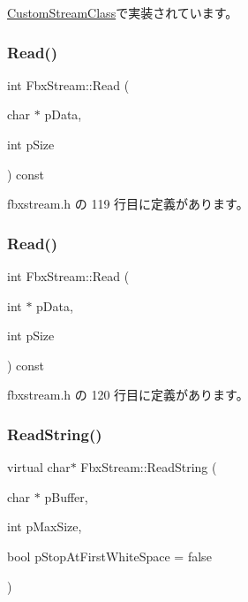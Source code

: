\hyperlink{class_custom_stream_class_a4b1260bd3c889278862f794ca9280bcb}{Custom\+Stream\+Class}で実装されています。

\mbox{\label{class_fbx_stream_ad54e82f43c2b8b441c427a77d2663a7e}} 
\subsubsection{\texorpdfstring{Read()}{Read()}\hspace{0.1cm}{\footnotesize\ttfamily [2/3]}}
{\footnotesize\ttfamily int Fbx\+Stream\+::\+Read (\begin{DoxyParamCaption}\item[{char $\ast$}]{p\+Data,  }\item[{int}]{p\+Size }\end{DoxyParamCaption}) const\hspace{0.3cm}{\ttfamily [inline]}}



 fbxstream.\+h の 119 行目に定義があります。

\mbox{\label{class_fbx_stream_afeadb32985899a9d3eb21aead9bbb546}} 
\subsubsection{\texorpdfstring{Read()}{Read()}\hspace{0.1cm}{\footnotesize\ttfamily [3/3]}}
{\footnotesize\ttfamily int Fbx\+Stream\+::\+Read (\begin{DoxyParamCaption}\item[{int $\ast$}]{p\+Data,  }\item[{int}]{p\+Size }\end{DoxyParamCaption}) const\hspace{0.3cm}{\ttfamily [inline]}}



 fbxstream.\+h の 120 行目に定義があります。

\mbox{\label{class_fbx_stream_a9c72065cd571b54b1cbcd6dfa89adb32}} 
\subsubsection{\texorpdfstring{Read\+String()}{ReadString()}}
{\footnotesize\ttfamily virtual char$\ast$ Fbx\+Stream\+::\+Read\+String (\begin{DoxyParamCaption}\item[{char $\ast$}]{p\+Buffer,  }\item[{int}]{p\+Max\+Size,  }\item[{bool}]{p\+Stop\+At\+First\+White\+Space = {\ttfamily false} }\end{DoxyParamCaption})\hspace{0.3cm}{\ttfamily [virtual]}}

